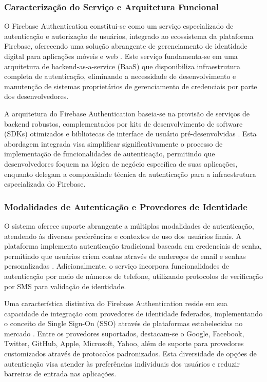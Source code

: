 \documentclass[
	12pt,				    %
	openright,			    %
	oneside,			    %
	a4paper,			    %
    sumario=tradicional,    %
	english,			    %
	brazil,				    %
	]{abntex2}              %
\begin{document}
\subsubsection{Caracterização do Serviço e Arquitetura Funcional}

O Firebase Authentication constitui-se como um serviço especializado de autenticação e autorização de usuários, integrado ao ecossistema da plataforma Firebase, oferecendo uma solução abrangente de gerenciamento de identidade digital para aplicações móveis e web \cite{google2023firebaseauth}. Este serviço fundamenta-se em uma arquitetura de backend-as-a-service (BaaS) que disponibiliza infraestrutura completa de autenticação, eliminando a necessidade de desenvolvimento e manutenção de sistemas proprietários de gerenciamento de credenciais por parte dos desenvolvedores.

A arquitetura do Firebase Authentication baseia-se na provisão de serviços de backend robustos, complementados por kits de desenvolvimento de software (SDKs) otimizados e bibliotecas de interface de usuário pré-desenvolvidas \cite{firebase2023sdk}. Esta abordagem integrada visa simplificar significativamente o processo de implementação de funcionalidades de autenticação, permitindo que desenvolvedores foquem na lógica de negócio específica de suas aplicações, enquanto delegam a complexidade técnica da autenticação para a infraestrutura especializada do Firebase.

\subsubsection{Modalidades de Autenticação e Provedores de Identidade}

O sistema oferece suporte abrangente a múltiplas modalidades de autenticação, atendendo às diversas preferências e contextos de uso dos usuários finais. A plataforma implementa autenticação tradicional baseada em credenciais de senha, permitindo que usuários criem contas através de endereços de email e senhas personalizadas \cite{stallings2023cryptography}. Adicionalmente, o serviço incorpora funcionalidades de autenticação por meio de números de telefone, utilizando protocolos de verificação por SMS para validação de identidade.

Uma característica distintiva do Firebase Authentication reside em sua capacidade de integração com provedores de identidade federados, implementando o conceito de Single Sign-On (SSO) através de plataformas estabelecidas no mercado \cite{jones2022federated}. Entre os provedores suportados, destacam-se o Google, Facebook, Twitter, GitHub, Apple, Microsoft, Yahoo, além de suporte para provedores customizados através de protocolos padronizados. Esta diversidade de opções de autenticação visa atender às preferências individuais dos usuários e reduzir barreiras de entrada nas aplicações.
\end{document}
